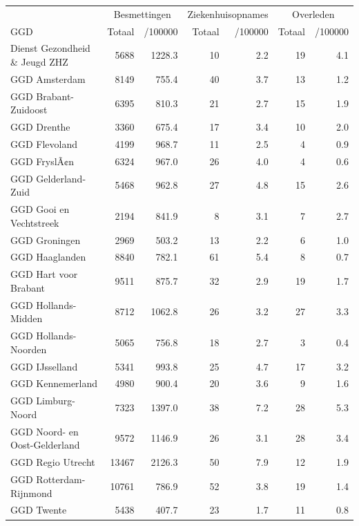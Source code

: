 \documentclass[
  english,
  man,floatsintext]{apa6}
\begin{document}
\begin{table}
\centering\begingroup\fontsize{10}{12}\selectfont

\begin{threeparttable}
\begin{tabular}{lrrrrrr}
\toprule
\multicolumn{1}{c}{ } & \multicolumn{2}{c}{Besmettingen} & \multicolumn{2}{c}{Ziekenhuisopnames} & \multicolumn{2}{c}{Overleden} \\
\cmidrule(l{3pt}r{3pt}){2-3} \cmidrule(l{3pt}r{3pt}){4-5} \cmidrule(l{3pt}r{3pt}){6-7}
GGD & Totaal & /100000 & Totaal & /100000 & Totaal & /100000\\
\midrule
Dienst Gezondheid \& Jeugd ZHZ & 5688 & 1228.3 & 10 & 2.2 & 19 & 4.1\\
GGD Amsterdam & 8149 & 755.4 & 40 & 3.7 & 13 & 1.2\\
GGD Brabant-Zuidoost & 6395 & 810.3 & 21 & 2.7 & 15 & 1.9\\
GGD Drenthe & 3360 & 675.4 & 17 & 3.4 & 10 & 2.0\\
GGD Flevoland & 4199 & 968.7 & 11 & 2.5 & 4 & 0.9\\
GGD FryslÃ¢n & 6324 & 967.0 & 26 & 4.0 & 4 & 0.6\\
GGD Gelderland-Zuid & 5468 & 962.8 & 27 & 4.8 & 15 & 2.6\\
GGD Gooi en Vechtstreek & 2194 & 841.9 & 8 & 3.1 & 7 & 2.7\\
GGD Groningen & 2969 & 503.2 & 13 & 2.2 & 6 & 1.0\\
GGD Haaglanden & 8840 & 782.1 & 61 & 5.4 & 8 & 0.7\\
GGD Hart voor Brabant & 9511 & 875.7 & 32 & 2.9 & 19 & 1.7\\
GGD Hollands-Midden & 8712 & 1062.8 & 26 & 3.2 & 27 & 3.3\\
GGD Hollands-Noorden & 5065 & 756.8 & 18 & 2.7 & 3 & 0.4\\
GGD IJsselland & 5341 & 993.8 & 25 & 4.7 & 17 & 3.2\\
GGD Kennemerland & 4980 & 900.4 & 20 & 3.6 & 9 & 1.6\\
GGD Limburg-Noord & 7323 & 1397.0 & 38 & 7.2 & 28 & 5.3\\
GGD Noord- en Oost-Gelderland & 9572 & 1146.9 & 26 & 3.1 & 28 & 3.4\\
GGD Regio Utrecht & 13467 & 2126.3 & 50 & 7.9 & 12 & 1.9\\
GGD Rotterdam-Rijnmond & 10761 & 786.9 & 52 & 3.8 & 19 & 1.4\\
GGD Twente & 5438 & 407.7 & 23 & 1.7 & 11 & 0.8\\

\end{tabular}
\end{threeparttable}
\end{table}
\end{document}
